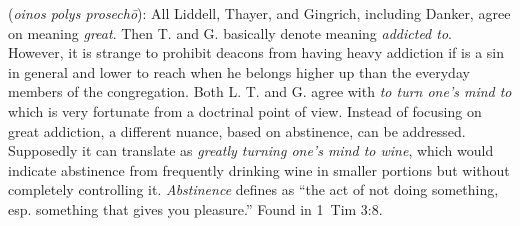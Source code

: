 \item[Wine abstinence,]

(\textit{oinos polys prosechō}):
All Liddell, Thayer, and Gingrich, including Danker, agree on  meaning \emph{great}. Then T. and G. basically denote  meaning \emph{addicted to}. However, it is strange to prohibit deacons from having heavy addiction if  is a sin in general and lower to reach when he belongs higher up than the everyday members of the congregation. Both L. T. and G. agree with \emph{to turn one's mind to} which is very fortunate from a doctrinal point of view. Instead of focusing on great addiction, a different nuance, based on abstinence, can be addressed. Supposedly it can translate as \emph{greatly turning one's mind to wine}, which would indicate abstinence from frequently drinking wine in smaller portions but without completely controlling it. \emph{Abstinence} defines as ``the act of not doing something, esp. something that gives you pleasure.''
Found in 1~Tim 3:8.
